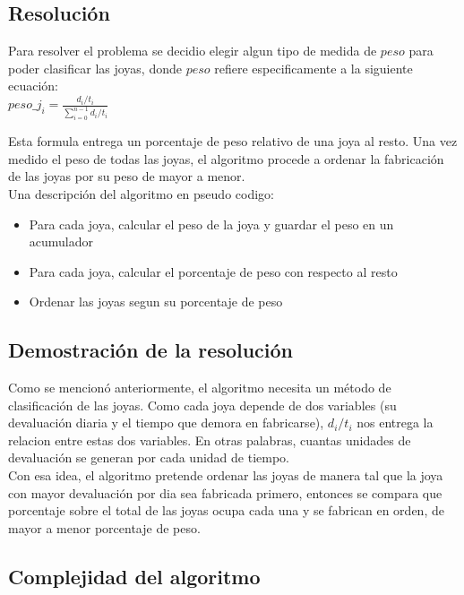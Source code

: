 \subsection{Resoluci\'on}

Para resolver el problema se decidio elegir algun tipo de medida de $peso$ para poder clasificar las joyas, donde $peso$ refiere especificamente a la siguiente ecuaci\'on: \\

$peso\_j_{i} = \frac{d_{i} / t_{i}}{\sum\limits_{i=0}^{n-1} d_{i} / t_{i}}$

Esta formula entrega un porcentaje de peso relativo de una joya al resto. Una vez medido el peso de todas las joyas, el algoritmo procede a ordenar la fabricaci\'on de las joyas por su peso de mayor a menor. \\

Una descripci\'on del algoritmo en pseudo codigo:

\begin{itemize}
\item Para cada joya, calcular el peso de la joya y guardar el peso en un acumulador
\item Para cada joya, calcular el porcentaje de peso con respecto al resto
\item Ordenar las joyas segun su porcentaje de peso
\end{itemize}

\subsection{Demostraci\'on de la resoluci\'on}

Como se mencion\'o anteriormente, el algoritmo necesita un m\'etodo de clasificaci\'on de las joyas. Como cada joya depende de dos variables (su devaluaci\'on diaria y el tiempo que demora en fabricarse), $d_{i}/t_{i}$ nos entrega la relacion entre estas dos variables. En otras palabras, cuantas unidades de devaluaci\'on se generan por cada unidad de tiempo. \\

Con esa idea, el algoritmo pretende ordenar las joyas de manera tal que la joya con mayor devaluaci\'on por dia sea fabricada primero, entonces se compara que porcentaje sobre el total de las joyas ocupa cada una y se fabrican en orden, de mayor a menor porcentaje de peso.

\subsection{Complejidad del algoritmo}

